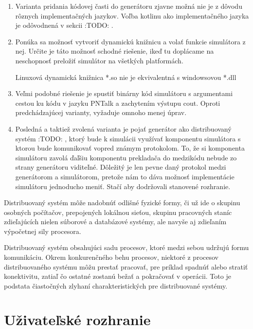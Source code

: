 \begin{enumerate}
	\item Varianta pridania kódovej časti do generátoru zjavne možná nie je z dôvodu rôznych implementačných jazykov. Voľba kotlinu ako implementačného jazyka je odôvodnená v sekcii :TODO: .
	
	\item Ponúka sa možnosť vytvoriť dynamickú knižnicu a volať funkcie simulátora z nej. Určite je táto možnosť schodné riešenie, ikeď tu doplácame na neschopnosť preložiť simulátor na všetkých platformách.
	
	\begin{note}
		Linuxová dynamická knižnica *.so nie je ekvivalentná s windowsovou *.dll
	\end{note}
	
	\item Veľmi podobné riešenie je spustiť binárny kód simulátoru s argumentami cestou ku kódu v jazyku PNTalk a zachytením výstupu cout. Oproti predchádzajúcej varianty, vyžaduje omnoho menej úprav.
	
	\item Posledná a taktiež zvolená varianta je pojať generátor ako distribuovaný systém :TODO: , ktorý bude k simulácii využívať komponentu simulátora s ktorou bude komunikovať vopred známym protokolom. To, že si komponenta simulátoru zavolá ďaľšiu komponentu prekladača do medzikódu nebude zo strany generátoru viditeľné. Dôležitý je len pevne daný protokol medzi generátorom a simulátorom, pretože nám to dáva možnosť implementácie simulátoru jednoducho meniť. Stačí aby dodržovali stanovené rozhranie.
	
\end{enumerate}

Distribuovaný systém môže nadobnúť odlišné fyzické formy, či už ide o skupinu osobných počítačov, prepojených lokálnou sieťou, skupinu pracovných staníc zdieľajúcích nielen súborové a databázové systémy, ale navyše aj zdieľaním výpočetnej sily procesora.\cite{}

Distribuovaný systém obsahujúci sadu procesov, ktoré medzi sebou udržujú formu komunikáciu. Okrem konkurenčného behu procesov, niektoré z procesov distribuovaného systému môžu prestať pracovať, pre príklad spadnúť alebo stratiť konektivitu, zatiaľ čo ostatné zostanú bežať a pokračovať v operácii. Toto je podstata čiastočných zlyhaní charakteristických pre distribuované systémy.

\section{Uživateľské rozhranie}

